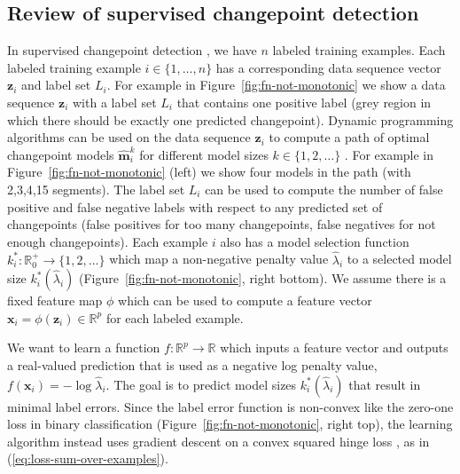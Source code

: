 \documentclass{article}
\begin{document}
\subsection{Review of supervised changepoint detection}

In supervised changepoint detection \citep{Hocking2013icml}, we have  $n$ labeled training examples. 
Each labeled training example $i\in\{1,\dots,n\}$ has a corresponding data sequence vector $\mathbf z_i$ and label set $L_i$.
For example in Figure~\ref{fig:fn-not-monotonic} we show a data sequence $\mathbf z_i$ with a label set $L_i$ that contains one positive label (grey region in which there should be exactly one predicted changepoint).
Dynamic programming algorithms can be used on the data sequence $\mathbf z_i$ to compute a path of optimal changepoint models $\mathbf {\hat m}^k_i$ for different model sizes $k\in\{1,2,\dots\}$  \citep{Maidstone2016}.
For example in Figure~\ref{fig:fn-not-monotonic} (left) we show four models in the path (with 2,3,4,15 segments).
The label set $L_i$ can be used to compute the number of false positive and false negative labels with respect to any predicted set of changepoints (false positives for too many changepoints, false negatives for not enough changepoints).
Each example $i$ also has a model selection function $k^*_i:\mathbb R^+_0 \rightarrow \{1,2,\dots\}$ which map a non-negative penalty value $\hat \lambda_i$ to a selected model size $k^*_i(\hat \lambda_i)$ (Figure~\ref{fig:fn-not-monotonic}, right bottom).
We assume there is a fixed feature map $\phi$ which can be used to compute a feature vector $\mathbf x_i = \phi(\mathbf z_i)\in\mathbb R^p$ for each labeled example.

We want to learn a function $f:\mathbb R^p\rightarrow \mathbb R$ which inputs a feature vector and outputs a real-valued prediction that is used as a negative log penalty value, $f(\mathbf x_i) = -\log \hat \lambda_i$.
The goal is to predict model sizes $k^*_i(\hat \lambda_i)$ that result in minimal label errors. 
Since the label error function is non-convex like the zero-one loss in binary classification (Figure~\ref{fig:fn-not-monotonic}, right top), the learning algorithm instead uses gradient descent on a convex squared hinge loss \citep{Hocking2013icml}, as in (\ref{eq:loss-sum-over-examples}).
\end{document}
